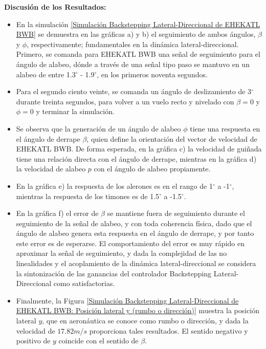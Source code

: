 \textbf{Discusión de los Resultados:}
\begin{itemize}
    \item En la simulación \ref{Simulación Backstepping Lateral-Direccional de EHEKATL BWB} se demuestra en las gráficas a) y b) el seguimiento de ambos ángulos, $\beta$ y $\phi$, respectivamente; fundamentales en la dinámica lateral-direccional. 
    Primero, se comanda para EHEKATL BWB una señal de seguimiento para el ángulo de alabeo, dónde a través de una señal tipo paso se mantuvo en un alabeo de entre 1.3$^\circ$ - 1.9$^\circ$, en los primeros noventa segundos.
    \item Para el segundo ciento veinte, se comanda un ángulo de deslizamiento de 3$^\circ$ durante treinta segundos, para volver a un vuelo recto y nivelado con $\beta=0$ y $\phi=0$ y terminar la simulación.
    \item Se observa que la generación de un ángulo de alabeo $\phi$ tiene una respuesta en el ángulo de derrape $\beta$, quien define la orientación del vector de velocidad de EHEKATL BWB. De forma esperada, en la gráfica c) la velocidad de guiñada tiene una relación directa con el ángulo de derrape, mientras en la gráfica d) la velocidad de alabeo $p$ con el ángulo de alabeo propiamente. 
    \item En la gráfica e) la respuesta de los alerones es en el rango de 1$^\circ$ a -1$^\circ$, mientras la respuesta de los timones es de 1.5$^\circ$ a -1.5$^\circ$.
    \item En la gráfica f) el error de $\beta$ se mantiene fuera de seguimiento durante el seguimiento de la señal de alabeo, y con toda coherencia física, dado que el ángulo de alabeo genera esta respuesta en el ángulo de derrape, y por tanto este error es de esperarse. El comportamiento del error es muy rápido en aproximar la señal de seguimiento, y dada la complejidad de las no linealidades y el acoplamiento de la dinámica lateral-direccional se considera la sintonización de las ganancias del controlador Backstepping Lateral-Direccional como satisfactorias. 
    \item Finalmente, la Figura \ref{Simulación Backstepping Lateral-Direccional de EHEKATL BWB: Posición lateral y (rumbo o dirección)} muestra la posición lateral $y$, que en aeronáutica se conoce como rumbo o dirección, y dada la velocidad de $17.82 m/s$ proporciona tales resultados. El sentido negativo y positivo de $y$ coincide con el sentido de $\beta$. 
\end{itemize}


